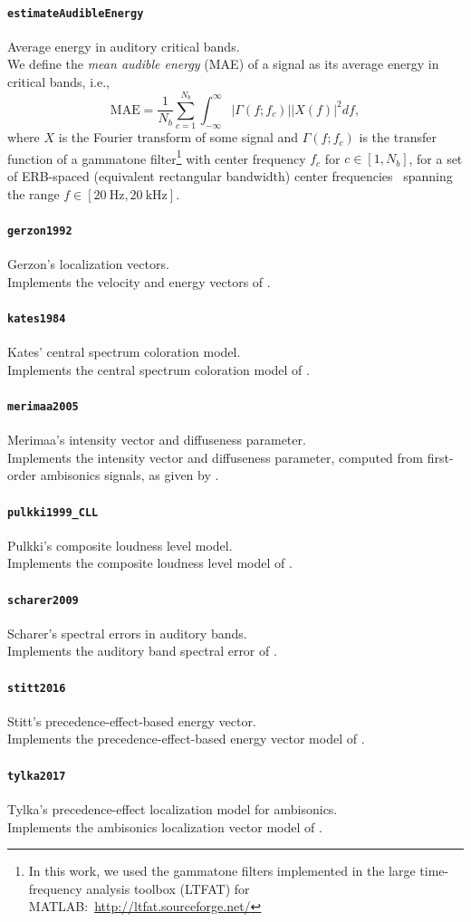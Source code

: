 \documentclass[11pt, oneside]{article}
\newcommand{\function}[1]{\paragraph*{\texttt{#1}}}
\begin{document}
\function{estimateAudibleEnergy} Average energy in auditory critical bands. \\
We define the \textit{mean audible energy} (MAE) of a signal as its average energy in critical bands, i.e.,
\begin{equation}\label{eq:estimateAudibleEnergy}
\text{MAE} = \frac{1}{N_b} \sum_{c = 1}^{N_b} \int_{-\infty}^\infty |\Gamma(f;f_c)| |X(f)|^2 df,
\end{equation}
where $X$ is the Fourier transform of some signal and $\Gamma(f;f_c)$ is the transfer function of a gammatone filter\footnote{In this work, we used the gammatone filters implemented in the large time-frequency analysis toolbox (LTFAT) for MATLAB:~\url{http://ltfat.sourceforge.net/}} with center frequency $f_c$ for $c \in [1, N_b]$, for a set of ERB-spaced (equivalent rectangular bandwidth) center frequencies~\citep{GlasbergMoore1990} spanning the range $f \in [20~\text{Hz}, 20~\text{kHz}]$.

\function{gerzon1992} Gerzon's localization vectors. \\
Implements the velocity and energy vectors of \citet{Gerzon1992}.

\function{kates1984} Kates' central spectrum coloration model. \\
Implements the central spectrum coloration model of \citet{Kates1984}.

\function{merimaa2005} Merimaa's intensity vector and diffuseness parameter. \\
Implements the intensity vector and diffuseness parameter, computed from first-order ambisonics signals, as given by \citet{MerimaaPulkki2005}.

\function{pulkki1999\_CLL} Pulkki's composite loudness level model. \\
Implements the composite loudness level model of \citet{Pulkki1999}.

\function{scharer2009} Scharer's spectral errors in auditory bands. \\
Implements the auditory band spectral error of \citet{ScharerLindau2009}.

\function{stitt2016} Stitt's precedence-effect-based energy vector. \\
Implements the precedence-effect-based energy vector model of \citet{Stitt2016}.

\function{tylka2017} Tylka's precedence-effect localization model for ambisonics. \\
Implements the ambisonics localization vector model of \citet{TylkaChoueiri2017a}.
\end{document}
